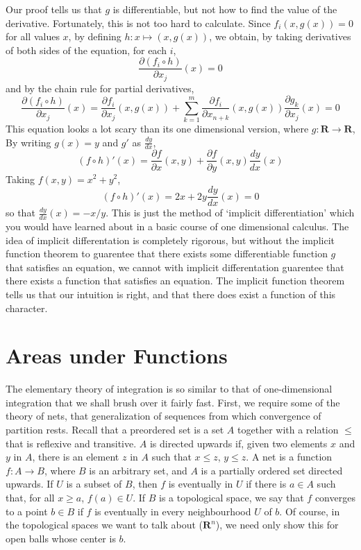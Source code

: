 \documentclass[12pt]{amsbook}
\theoremstyle{plain}
\theoremstyle{definition}
\begin{document}
Our proof tells us that $g$ is differentiable, but not how to find the value of the derivative. Fortunately, this is not too hard to calculate. Since $f_i(x,g(x)) = 0$ for all values $x$, by defining $h: x \mapsto (x,g(x))$, we obtain, by taking derivatives of both sides of the equation, for each $i$,
%
\[ \frac{\partial (f_i \circ h)}{\partial x_j} (x) = 0 \]
%
and by the chain rule for partial derivatives,
%
\[ \frac{\partial (f_i \circ h)}{\partial x_j} (x) = \frac{\partial f_i}{\partial x_j}(x,g(x)) + \sum_{k = 1}^{m} \frac{\partial f_i}{\partial x_{n + k}}(x,g(x)) \frac{\partial g_k}{\partial x_j} (x) = 0 \]
%
This equation looks a lot scary than its one dimensional version, where $g: \mathbf{R} \to \mathbf{R}$, By writing $g(x) = y$ and $g'$ as $\frac{dy}{dx}$,
%
\[ (f \circ h)'(x) = \frac{\partial f}{\partial x}(x,y) + \frac{\partial f}{\partial y}(x,y) \frac{dy}{dx}(x) \]
%
Taking $f(x,y) = x^2 + y^2$,
%
\[ (f \circ h)'(x) = 2x + 2y \frac{dy}{dx}(x) = 0 \]
%
so that $\frac{dy}{dx}(x) = -x/y$. This is just the method of `implicit differentiation' which you would have learned about in a basic course of one dimensional calculus. The idea of implicit differentation is completely rigorous, but without the implicit function theorem to guarentee that there exists some differentiable function $g$ that satisfies an equation, we cannot with implicit differentation guarentee that there exists a function that satisfies an equation. The implicit function theorem tells us that our intuition is right, and that there does exist a function of this character.





\chapter{Areas under Functions}

The elementary theory of integration is so similar to that of one-dimensional integration that we shall brush over it fairly fast. First, we require some of the theory of nets, that generalization of sequences from which convergence of partition rests. Recall that a preordered set is a set $A$ together with a relation $\leq$ that is reflexive and transitive. $A$ is directed upwards if, given two elements $x$ and $y$ in $A$, there is an element $z$ in $A$ such that $x \leq z$, $y \leq z$. A net is a function $f:A \to B$, where $B$ is an arbitrary set, and $A$ is a partially ordered set directed upwards. If $U$ is a subset of $B$, then $f$ is eventually in $U$ if there is $a \in A$ such that, for all $x \geq a$, $f(a) \in U$. If $B$ is a topological space, we say that $f$ converges to a point $b \in B$ if $f$ is eventually in every neighbourhood $U$ of $b$. Of course, in the topological spaces we want to talk about ($\mathbf{R}^n$), we need only show this for open balls whose center is $b$.
\end{document}
